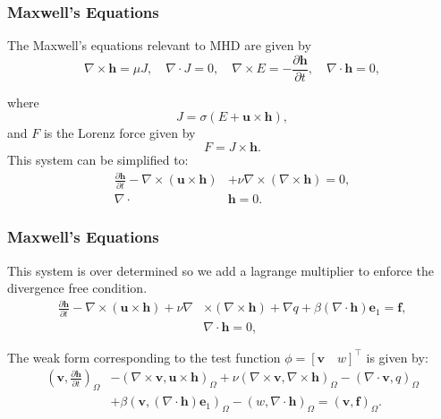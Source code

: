 \documentclass[mathserif]{beamer} %
\begin{document}
\begin{frame}
    \frametitle{Maxwell's Equations}
    The Maxwell's equations relevant to MHD are given by
    \[\nabla \times \boldsymbol{h} = \mu J,\quad \nabla \cdot J=0,\quad \nabla \times E = -\frac{\partial \boldsymbol{h} }{\partial t},\quad \nabla \cdot \boldsymbol{h} = 0,\]

    where \[ J = \sigma (E + \boldsymbol{u}\times \boldsymbol{h}),\]
    and $F$ is the Lorenz force given by \[ F = J\times \boldsymbol{h}.\]
    This system can be simplified to: %
    \begin{align*}
        \frac{\partial \boldsymbol{h} }{\partial t} - \nabla \times (\boldsymbol{u}\times \boldsymbol{h}) &+ \nu \nabla \times (\nabla \times \boldsymbol{h}) = 0,\\
        \nabla \cdot &\boldsymbol{h} = 0.
    \end{align*}


\end{frame}

\begin{frame}
    \frametitle{Maxwell's Equations}
    This system is over determined so we add a lagrange multiplier to enforce the divergence free condition.
        \pause
    \begin{align*}
        \frac{\partial \boldsymbol{h} }{\partial t} - \nabla \times (\boldsymbol{u}\times \boldsymbol{h}) + \nu \nabla &\times (\nabla \times \boldsymbol{h}) + \nabla q + \beta (\nabla \cdot \boldsymbol{h})\boldsymbol{e}_1= \boldsymbol{f},\\
        &\nabla \cdot \boldsymbol{h} = 0,
    \end{align*}
   \pause 

    The weak form corresponding to the test function $\phi = [\boldsymbol{v}\quad w]^\top$ is given by:
   \pause 
    \begin{align*}
            \left(\boldsymbol{v},\frac{\partial \boldsymbol{h} }{\partial t}\right)_\Omega
            &-\left(\nabla \times \boldsymbol{v},\boldsymbol{u}\times \boldsymbol{h}\right)_\Omega
            + \nu\left(\nabla \times\boldsymbol{v},\nabla \times \boldsymbol{h}\right)_\Omega 
            - \left(\nabla \cdot \boldsymbol{v},q\right)_\Omega \\
            &+ \beta\left(\boldsymbol{v}, (\nabla \cdot \boldsymbol{h})\boldsymbol{e}_1\right)_\Omega
            -\left(w,\nabla  \cdot \boldsymbol{h}\right)_\Omega = (\boldsymbol{v},\boldsymbol{f})_\Omega.
        \end{align*}

\end{frame}
\end{document}
